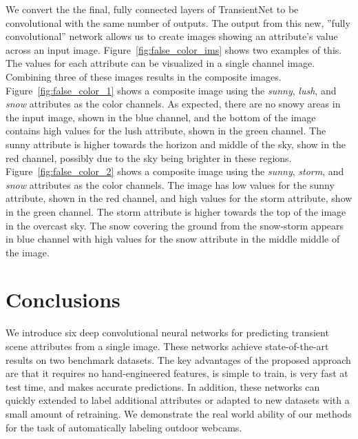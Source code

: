 \documentclass[10pt,twocolumn,letterpaper]{article}
\newcommand{\figref}[1]{Figure~\ref{fig:#1}}
\begin{document}
We convert the the final, fully connected layers of TransientNet to be
convolutional with the same number of outputs.  The output from this new,
''fully convolutional'' network allows us to create images showing an
attribute's value across an input image.  \figref{false_color_ims} shows two
examples of this.  The values for each attribute can be visualized in a single
channel image.  Combining three of these images results in the composite
images.  \figref{false_color_1} shows a composite image using the
\textit{sunny}, \textit{lush}, and \textit{snow} attributes as the color
channels.  As expected, there are no snowy areas in the input image, shown
in the blue channel, and the bottom of the image contains high values for the
lush attribute, shown in the green channel.  The sunny attribute is higher 
towards the horizon and middle of the sky, show in the red channel, possibly 
due to the sky being brighter in these regions.  \figref{false_color_2} shows
a composite image using the \textit{sunny}, \textit{storm}, and \textit{snow}
attributes as the color channels.  The image has low values for the sunny
attribute, shown in the red channel, and high values for the storm attribute,
show in the green channel.  The storm attribute is higher towards the top
of the image in the overcast sky.  The snow covering the ground from the 
snow-storm appears in blue channel with high values for the snow attribute in
the middle middle of the image.

\section{Conclusions}
We introduce six deep convolutional neural networks for predicting transient
scene attributes from a single image. These networks achieve state-of-the-art
results on two benchmark datasets. The key advantages of the proposed approach
are that it requires no hand-engineered features, is simple to train, is very
fast at test time, and makes accurate predictions. In addition, these networks
can quickly extended to label additional attributes or adapted to new datasets
with a small amount of retraining.  We demonstrate the real world
ability of our methods for the task of automatically labeling outdoor
webcams.

{\small


}
\end{document}

